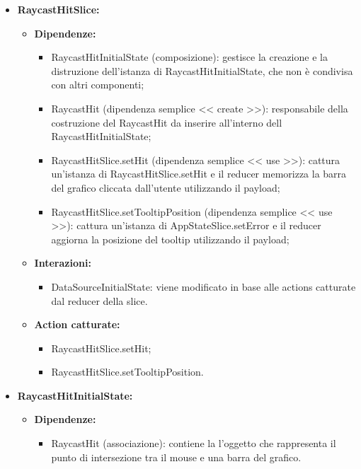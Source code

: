\begin{itemize}
    \item \textbf{RaycastHitSlice:}
    \begin{itemize}
        \item \textbf{Dipendenze:}
        \begin{itemize}
            \item RaycastHitInitialState (composizione): gestisce la creazione e la distruzione dell'istanza di RaycastHitInitialState, che non è condivisa con altri componenti;
            \item RaycastHit (dipendenza semplice << create >>): responsabile della costruzione del RaycastHit da inserire all’interno dell RaycastHitInitialState;
            \item RaycastHitSlice.setHit (dipendenza semplice << use >>): cattura un’istanza di RaycastHitSlice.setHit e il reducer memorizza la barra del grafico cliccata dall'utente utilizzando il payload;
            \item RaycastHitSlice.setTooltipPosition (dipendenza semplice << use >>): cattura un’istanza di AppStateSlice.setError e il reducer aggiorna la posizione del tooltip utilizzando il payload;
        \end{itemize} 
        \item \textbf{Interazioni:}
        \begin{itemize}
            \item DataSourceInitialState: viene modificato in base alle actions catturate dal reducer della slice.
        \end{itemize} 
        \item \textbf{Action catturate:}
        \begin{itemize}
            \item RaycastHitSlice.setHit;
            \item RaycastHitSlice.setTooltipPosition.
        \end{itemize} 
    \end{itemize}

    
    \item \textbf{RaycastHitInitialState:}
    \begin{itemize}
        \item \textbf{Dipendenze:}
        \begin{itemize}
            \item RaycastHit (associazione): contiene la l'oggetto che rappresenta il punto di intersezione tra il mouse e una barra del grafico.
        \end{itemize} 
    \end{itemize}


\end{itemize}
